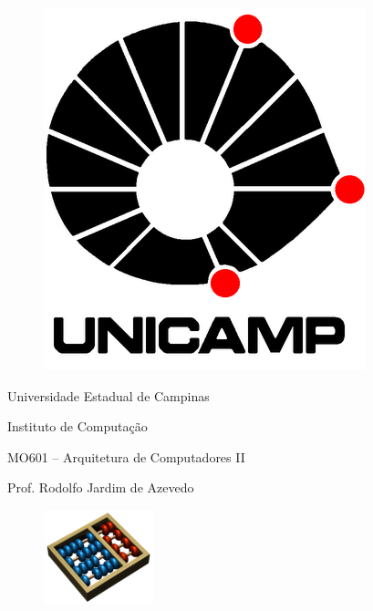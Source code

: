 
\begin{titlepage}
\begin{center}

\begin{minipage}{0.2\linewidth}
    \begin{flushleft}
        \begin{figure}[H]
    		\includegraphics[scale=0.21]{Imagens/LOGO-UNICAMP.png}
    	\end{figure}
    \end{flushleft}
\end{minipage}
\begin{minipage}{0.5\linewidth}
	\begin{center}
		
		Universidade Estadual de Campinas
		
		Instituto de Computação
		
		MO601 – Arquitetura de Computadores II

		Prof. Rodolfo Jardim de Azevedo
		
	\end{center}
\end{minipage}
\begin{minipage}{0.25\linewidth}
    \begin{flushleft}
        \begin{figure}[H]
    		\includegraphics[scale=0.6]{Imagens/logo-ic-unicamp-slant-tint-beg-sky-ora-0120.png}
    	\end{figure}
    \end{flushleft}
\end{minipage}


\end{center}
\end{titlepage}
